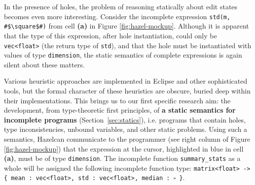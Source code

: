 \documentclass[letterpaper,USenglish]{lipics-v2016}
\let\li\lstinline
\newcommand{\Hazel}[0]{\textsf{Hazel}}
\newcommand{\HazelEnv}[0]{\Hazel}
\begin{document}
In the presence of holes, the problem of reasoning statically about edit states
becomes even more interesting.  Consider the incomplete expression \lstinline{std(m, #$\square$#)} 
from cell \textbf{(a)} in Figure \ref{fig:hazel-mockup}.
%
%
Although it is apparent that the type of this expression, after hole instantiation, could only be \lstinline{vec<float>} (the return type of \lstinline{std}),
and that the hole must be instantiated with values of type \li{dimension}, the static
semantics of complete expressions is again silent about these matters. 

Various heuristic
approaches are implemented in Eclipse and other sophisticated tools, but the 
formal character of these heuristics are obscure, buried deep within their implementations. This brings us to our first specific research aim: the 
development, from type-theoretic first principles, of \textbf{a static semantics for incomplete programs} (Section~\ref{sec:statics}),
i.e. programs that contain holes, type inconsistencies, unbound variables, and
other static problems. Using such a semantics, \HazelEnv can 
communicate to the programmer (see right column of Figure \ref{fig:hazel-mockup}) that the expression at the cursor, highlighted in blue in cell \textbf{(a)}, must be of type \li{dimension}. The incomplete function
\li{summary_stats} as a whole will be assigned the following incomplete function
type: \texttt{matrix<float> -> \{ {mean} : vec<float>, std : vec<float>, median :~$\square$ \}}.
\end{document}
